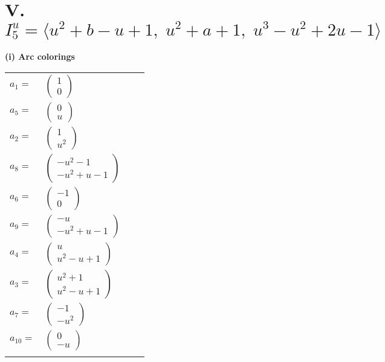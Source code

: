 \documentclass[1p]{elsarticle_modified}
\theoremstyle{definition}
\begin{document}
\centering \section*{V. $I^u_{5}= \langle u^2+b- u+1,\;u^2+a+1,\;u^3- u^2+2 u-1 \rangle$}
\flushleft \textbf{(i) Arc colorings}\\
\begin{tabular}{m{7pt} m{180pt} m{7pt} m{180pt} }
\flushright $a_{1}=$&$\begin{pmatrix}1\\0\end{pmatrix}$ \\
\flushright $a_{5}=$&$\begin{pmatrix}0\\u\end{pmatrix}$ \\
\flushright $a_{2}=$&$\begin{pmatrix}1\\u^2\end{pmatrix}$ \\
\flushright $a_{8}=$&$\begin{pmatrix}- u^2-1\\- u^2+u-1\end{pmatrix}$ \\
\flushright $a_{6}=$&$\begin{pmatrix}-1\\0\end{pmatrix}$ \\
\flushright $a_{9}=$&$\begin{pmatrix}- u\\- u^2+u-1\end{pmatrix}$ \\
\flushright $a_{4}=$&$\begin{pmatrix}u\\u^2- u+1\end{pmatrix}$ \\
\flushright $a_{3}=$&$\begin{pmatrix}u^2+1\\u^2- u+1\end{pmatrix}$ \\
\flushright $a_{7}=$&$\begin{pmatrix}-1\\- u^2\end{pmatrix}$ \\
\flushright $a_{10}=$&$\begin{pmatrix}0\\- u\end{pmatrix}$\\&\end{tabular}
\end{document}
